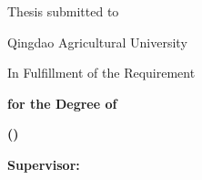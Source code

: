 {  \vspace{0.95cm}
  {{\qauTimes\fontsize{16bp}{20bp}\selectfont Thesis submitted to\par}}

  \vspace{0.92cm}
  {{\qauTimes\fontsize{23bp}{27bp}\selectfont Qingdao Agricultural University\par}}

  \vspace{1.35cm}
  {{\qauTimes\fontsize{16bp}{20bp}\selectfont In Fulfillment of the Requirement\par}}

  \vspace{0.72cm}
  {{\qauTimes\bfseries\fontsize{16bp}{19bp}\selectfont for the Degree of\par}}

  \vspace{0.88cm}
  {{\qauTimes\bfseries\fontsize{21bp}{25bp}\selectfont \qaudegreeen\par}}

  \vspace{0.95cm}
  {{\qauTimes\bfseries\fontsize{16bp}{20bp}\selectfont \qauauthoren\par}}

  \vspace{1.00cm}
  {{\qauTimes\bfseries\fontsize{15bp}{19bp}\selectfont (\qaucollegeen)\par}}

  \vspace{0.88cm}
  {{\qauTimes\bfseries\fontsize{15bp}{19bp}\selectfont Supervisor: \qausupervisoren\par}}

  \vfill
  {{\qauTimes\fontsize{13bp}{16bp}\selectfont \qaucityen\par}}
  \vspace{0.15cm}
  {{\qauTimes\fontsize{13bp}{16bp}\selectfont \qaudateen\par}}
}



\endgroup
\clearpage
